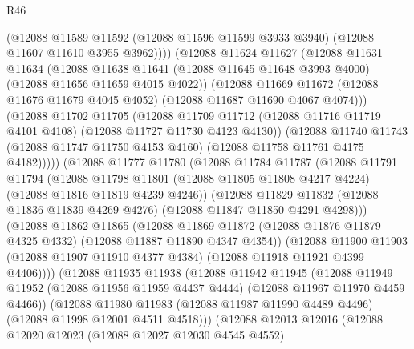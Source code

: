 \begin{lexlean}{R46}
\begin{coremodule}
              (@12088
                @11589
                @11592
                (@12088 @11596 @11599 @3933 @3940)
                (@12088 @11607 @11610 @3955 @3962))))
          (@12088
            @11624
            @11627
            (@12088
              @11631
              @11634
              (@12088
                @11638
                @11641
                (@12088 @11645 @11648 @3993 @4000)
                (@12088 @11656 @11659 @4015 @4022))
              (@12088
                @11669
                @11672
                (@12088 @11676 @11679 @4045 @4052)
                (@12088 @11687 @11690 @4067 @4074)))
            (@12088
              @11702
              @11705
              (@12088
                @11709
                @11712
                (@12088 @11716 @11719 @4101 @4108)
                (@12088 @11727 @11730 @4123 @4130))
              (@12088
                @11740
                @11743
                (@12088 @11747 @11750 @4153 @4160)
                (@12088 @11758 @11761 @4175 @4182)))))
        (@12088
          @11777
          @11780
          (@12088
            @11784
            @11787
            (@12088
              @11791
              @11794
              (@12088
                @11798
                @11801
                (@12088 @11805 @11808 @4217 @4224)
                (@12088 @11816 @11819 @4239 @4246))
              (@12088
                @11829
                @11832
                (@12088 @11836 @11839 @4269 @4276)
                (@12088 @11847 @11850 @4291 @4298)))
            (@12088
              @11862
              @11865
              (@12088
                @11869
                @11872
                (@12088 @11876 @11879 @4325 @4332)
                (@12088 @11887 @11890 @4347 @4354))
              (@12088
                @11900
                @11903
                (@12088 @11907 @11910 @4377 @4384)
                (@12088 @11918 @11921 @4399 @4406))))
          (@12088
            @11935
            @11938
            (@12088
              @11942
              @11945
              (@12088
                @11949
                @11952
                (@12088 @11956 @11959 @4437 @4444)
                (@12088 @11967 @11970 @4459 @4466))
              (@12088
                @11980
                @11983
                (@12088 @11987 @11990 @4489 @4496)
                (@12088 @11998 @12001 @4511 @4518)))
            (@12088
              @12013
              @12016
              (@12088
                @12020
                @12023
                (@12088 @12027 @12030 @4545 @4552)

\end{coremodule}
\end{lexlean}
